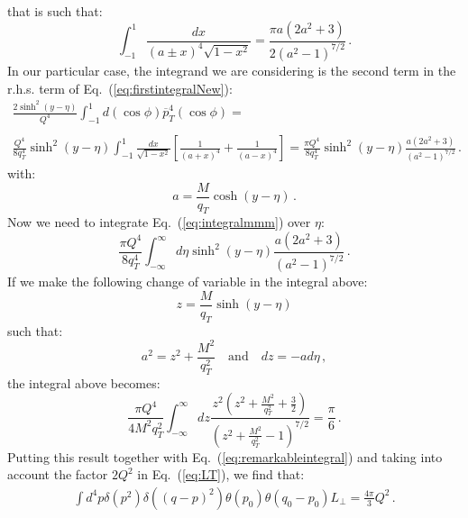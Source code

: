\documentclass[10pt,a4paper]{article}
\begin{document}
that is such that:
\begin{equation}
\int_{-1}^{1} \frac{dx}{(a\pm
  x)^4\sqrt{1-x^2}}=\frac{\pi a(2a^2+3)}{2(a^2-1)^{7/2}}\,.
\end{equation}
In our particular case, the integrand we are considering is the second
term in the r.h.s. term of Eq.~(\ref{eq:firstintegralNew}):
\begin{equation}\label{eq:integralmmm}
\begin{array}{l}
\displaystyle
  \frac{2\sinh^2(y-\eta)}{Q^4}\int_{-1}^{1}d(\cos\phi)\overline{p}_T^4(\cos\phi)=\\
\\
\displaystyle\frac{Q^4}{8q_T^4} \sinh^2(y-\eta) \int_{-1}^{1} \frac{dx}{\sqrt{1-x^2}}\left[\frac{1}{(a+
      x)^4}+\frac1{(a-
      x)^4}\right]= \frac{\pi Q^4}{8q_T^4}\sinh^2(y-\eta) \frac{
  a(2a^2+3)}{(a^2-1)^{7/2}}\,.
\end{array}
\end{equation}
with:
\begin{equation}
a =\frac{M}{q_T}\cosh(y-\eta)\,.
\end{equation}
Now we need to integrate Eq.~(\ref{eq:integralmmm}) over $\eta$:
\begin{equation}
  \frac{\pi Q^4}{8q_T^4} \int_{-\infty}^{\infty}d\eta\sinh^2(y-\eta)\frac{
    a(2a^2+3)}{(a^2-1)^{7/2}}\,.
\end{equation}
If we make the following change of variable in the integral above:
\begin{equation}
z=\frac{M}{q_T}\sinh(y-\eta)
\end{equation}
such that:
\begin{equation}
a^2 = z^2+\frac{M^2}{q_T^2}\quad\mbox{and}\quad dz = -ad\eta\,,
\end{equation}
the integral above becomes:
\begin{equation}
\frac{\pi Q^4}{4M^2 q_T^2} \int_{-\infty}^{\infty}dz\frac{
  z^2\left(z^2+\frac{M^2}{q_T^2}+\frac32\right)}{\left(z^2+\frac{M^2}{q_T^2}-1\right)^{7/2}}=\frac{\pi}{6}\,.
\end{equation}
Putting this result together with Eq.~(\ref{eq:remarkableintegral})
and taking into account the factor $2Q^2$ in Eq.~(\ref{eq:LT}), we find
that:
\begin{equation}\label{eq:normalisation}
\begin{array}{l}
  \displaystyle \int d^4p \delta(p^2) \delta((q-p)^2) \theta(p_{0})
  \theta(q_0-p_{0})L_\perp = \frac{4\pi}{3}Q^2\,.
\end{array}
\end{equation}
\end{document}
